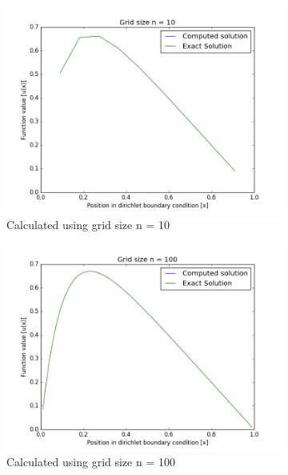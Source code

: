 \documentclass[a4paper,11pt]{article}
\begin{document}
{\begin{figure}[H]
	\centering
	\begin{subfigure}[b]{0.3\textwidth}
		\includegraphics[scale=0.3]{n=10}
		\caption{Calculated using grid size n = 10}
		\label{fig:n=10}
	\end{subfigure}
	\begin{subfigure}[b]{0.3\textwidth}
		\includegraphics[scale=0.3]{n=100}
		\caption{Calculated using grid size n = 100}
		\label{fig:n=100}
	\end{subfigure}
	\begin{subfigure}[b]{0.3\textwidth}

\end{subfigure}
\end{figure}}
\end{document}

